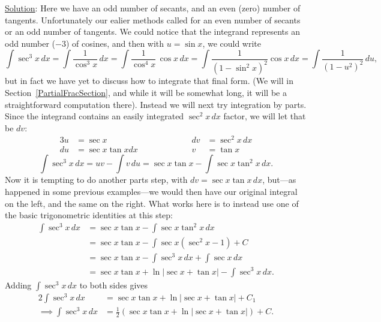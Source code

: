 \underline{Solution}: Here we have an odd number of secants,
and an even (zero) number of tangents.  Unfortunately our
ealier methods called for an even number of secants or
an odd number of tangents.  We could notice that the integrand
represents an odd number ($-3$) of cosines, and
then with $u=\sin x$, we could write
$$\int\sec^3x\,dx=\int\frac1{\cos^3x}\,dx=\int\frac1{\cos^4x}\,\cos x\,dx
                 =\int\frac1{\left(1-\sin^2x\right)^2}\cos x\,dx
                 =\int\frac1{\left(1-u^2\right)^2}\,du,$$
but in fact we have yet to discuss how to integrate that final
form. (We will in Section~\ref{PartialFracSection},
and while it will be somewhat long, it will be a straightforward computation
there).
Instead we will next try integration by parts.  
Since the integrand contains an easily integrated $\sec^2x\,dx$ factor, we will
let that be $dv$:
\begin{alignat*}{3}
u&=\sec x&&\qquad\qquad&dv&=\sec^2x\,dx\\
du&=\sec x\tan xdx&&&v&=\tan x 
\end{alignat*}
$$\int\sec^3x\,dx=uv-\int v\,du=\sec x\tan x-\int \sec x\tan^2x\,dx.$$
Now it is tempting to do another parts step, with $dv=\sec x\tan x\,dx$,
but---as happened in some previous examples---we would then have
our original integral on the left, and the same on the right.
What works here is to instead use one of the basic trigonometric 
identities at this step:
\begin{align*}
\int\sec^3x\,dx&=\sec x\tan x-\int\sec x \tan^2x\,dx\\
           &=\sec x \tan x-\int\sec x\left(\sec^2x-1\right)+C\\
       &=\sec x\tan x -\int\sec^3 x\,dx +\int\sec x\,dx\\
       &=\sec x\tan x+\ln|\sec x+\tan x|-\int\sec^3x\,dx.
\end{align*}
Adding $\int\sec^3x\,dx$ to both sides gives
\begin{align*}
2\int\sec^3x\,dx&=\sec x\tan x+\ln|\sec x+\tan x|+C_1\\
\implies
\int\sec^3x\,dx&=\frac12(\sec x\tan x+\ln|\sec x+\tan x|)+C.
\end{align*}
\eex

